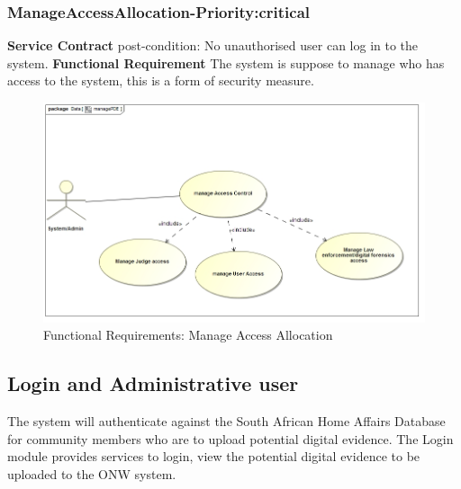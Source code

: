 \documentclass[a4paper,12pt]{article}
\begin{document}
\subsubsection{ManageAccessAllocation-Priority:critical}
\textbf{Service Contract}\newline
post-condition: No unauthorised user can log in to the system.\newline
\textbf{Functional Requirement}\newline
The system is suppose to manage who has access to the system, this is a form of security measure.\newline
\begin{figure}[H]
\includegraphics[width=\textwidth]{images/managePDE.jpg}
\caption{Functional Requirements: Manage Access Allocation\label{overflow}}
\end{figure}
\subsection{Login and Administrative user}
The system will authenticate against the South African Home Affairs Database for community members who are to upload potential digital evidence.\newline
The Login module provides services to login, view the potential digital evidence to be uploaded to the ONW system.\newline
\end{document}
